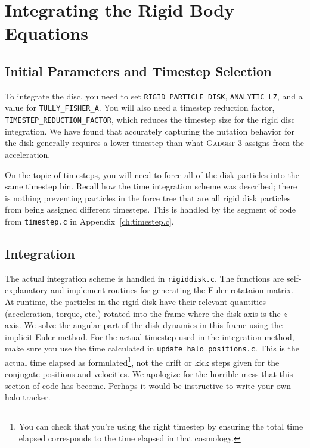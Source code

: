 \section{Integrating the Rigid Body Equations}




\subsection{Initial Parameters and Timestep Selection}
To integrate the disc, you need to set \texttt{RIGID\_PARTICLE\_DISK}, \texttt{ANALYTIC\_LZ}, and a value for \texttt{TULLY\_FISHER\_A}. You will also need a timestep reduction factor, \\\texttt{TIMESTEP\_REDUCTION\_FACTOR}, which reduces the timestep size for the rigid disc integration. We have found that accurately capturing the nutation behavior for the disk generally requires a lower timestep than what \textsc{Gadget-3} assigns from the acceleration.

On the topic of timesteps, you will need to force all of the disk particles into the same timestep bin. Recall how the time integration scheme was described; there is nothing preventing particles in the force tree that are all rigid disk particles from being assigned different timesteps. This is handled by the segment of code from \texttt{timestep.c} in Appendix~\ref{ch:timestep.c}.


\subsection{Integration}

The actual integration scheme is handled in \texttt{rigiddisk.c}. The functions are self-explanatory and implement routines for generating the Euler rotataion matrix. At runtime, the particles in the rigid disk have their relevant quantities (acceleration, torque, etc.) rotated into the frame where the disk axis is the $z$-axis. We solve the angular part of the disk dynamics in this frame using the implicit Euler method. For the actual timestep used in the integration method, make sure you use the time calculated in \texttt{update\_halo\_positions.c}. This is the actual time elapsed as formulated\footnote{You can check that you're using the right timestep by ensuring the total time elapsed corresponds to the time elapsed in that cosmology.}, not the drift or kick steps given for the conjugate positions and velocities. We apologize for the horrible mess that this section of code has become. Perhaps it would be instructive to write your own halo tracker.

